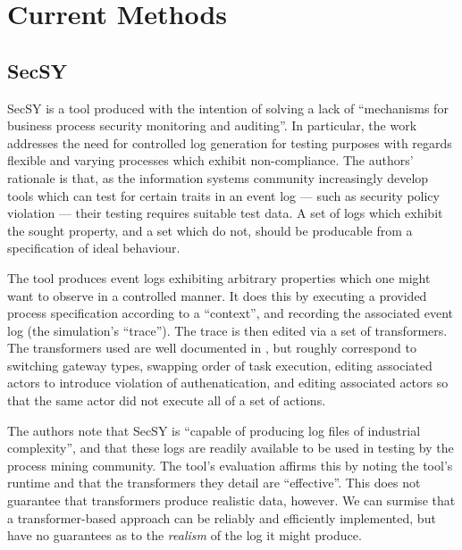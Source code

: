 \documentclass[12pt,draft]{article}
\begin{document}
\section{Current Methods}\label{sec:curr-methods}


\subsection{SecSY}
SecSY is a tool produced with the intention of solving a lack of
``mechanisms for business process security monitoring and auditing''. In
particular, the work addresses the need for controlled log generation for
testing purposes with regards flexible and varying processes which exhibit
non-compliance. The authors' rationale is that, as the information systems
community increasingly develop tools which can test for certain traits in an
event log --- such as security policy violation --- their testing requires
suitable test data. A set of logs which exhibit the sought property, and a set
which do not, should be producable from a specification of ideal behaviour.
\par

The tool produces event logs exhibiting arbitrary properties which one might
want to observe in a controlled manner. It does this by executing a provided
process specification according to a ``context'', and recording the associated
event log (the simulation's ``trace''). The trace is then edited via a set of
transformers. The transformers used are well documented in , but
roughly correspond to switching gateway types, swapping order of task execution,
editing associated actors to introduce violation of authenatication, and editing
associated actors so that the same actor did not execute all of a set of
actions.
\par

The authors note that SecSY is ``capable of producing log files of industrial
complexity'', and that these logs are readily available to be used in testing by
the process mining community. The tool's evaluation affirms this by noting the
tool's runtime and that the transformers they detail are ``effective''. This
does not guarantee that transformers produce realistic data, however. We can
surmise that a transformer-based approach can be reliably and efficiently
implemented, but have no guarantees as to the \emph{realism} of the log it might
produce.
\par
\end{document}
